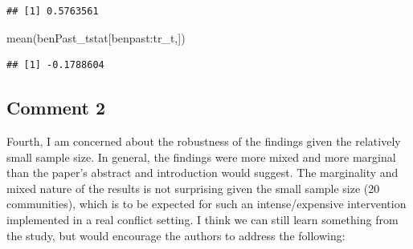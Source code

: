 \documentclass[
]{article}
\newenvironment{Shaded}{\begin{snugshade}}{\end{snugshade}}
\newcommand{\ControlFlowTok}[1]{\textcolor[rgb]{0.13,0.29,0.53}{\textbf{#1}}}
\newcommand{\FunctionTok}[1]{\textcolor[rgb]{0.00,0.00,0.00}{#1}}
\newcommand{\NormalTok}[1]{#1}
\newcommand{\OtherTok}[1]{\textcolor[rgb]{0.56,0.35,0.01}{#1}}
\newcommand{\SpecialCharTok}[1]{\textcolor[rgb]{0.00,0.00,0.00}{#1}}
\newcommand{\StringTok}[1]{\textcolor[rgb]{0.31,0.60,0.02}{#1}}
\begin{document}
\begin{Shaded}
\end{Shaded}

\begin{verbatim}
## [1] 0.5763561
\end{verbatim}

\begin{Shaded}
\begin{Highlighting}[]
\FunctionTok{mean}\NormalTok{(benPast\_tstat[}\StringTok{\textquotesingle{}benpast:tr\_t\textquotesingle{}}\NormalTok{,])}
\end{Highlighting}
\end{Shaded}

\begin{verbatim}
## [1] -0.1788604
\end{verbatim}

\hypertarget{comment-2}{%
\subsection{Comment 2}\label{comment-2}}

Fourth, I am concerned about the robustness of the findings given the
relatively small sample size. In general, the findings were more mixed
and more marginal than the paper's abstract and introduction would
suggest. The marginality and mixed nature of the results is not
surprising given the small sample size (20 communities), which is to be
expected for such an intense/expensive intervention implemented in a
real conflict setting. I think we can still learn something from the
study, but would encourage the authors to address the following:
\end{document}
